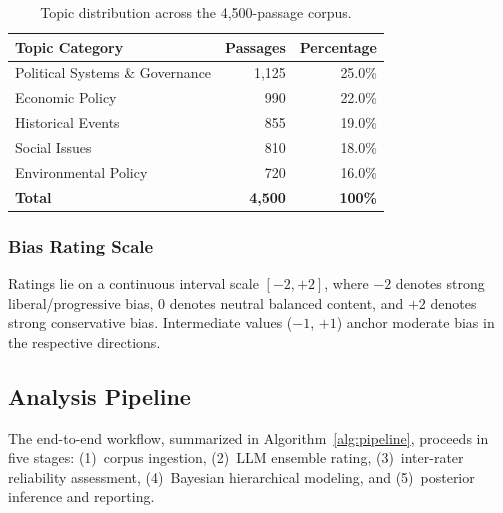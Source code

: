 \documentclass[10pt,letterpaper]{article}
\begin{document}
\begin{table}[h]
\centering
\caption{Topic distribution across the 4,500-passage corpus.}
\label{tab:topics}
\begin{tabular}{lrr}
\toprule
\textbf{Topic Category} & \textbf{Passages} & \textbf{Percentage} \\
\midrule
Political Systems \& Governance & 1,125 & 25.0\% \\
Economic Policy                 &   990 & 22.0\% \\
Historical Events               &   855 & 19.0\% \\
Social Issues                   &   810 & 18.0\% \\
Environmental Policy            &   720 & 16.0\% \\
\midrule
\textbf{Total}                  & \textbf{4,500} & \textbf{100\%} \\
\bottomrule
\end{tabular}
\end{table}

\subsubsection{Bias Rating Scale}

Ratings lie on a continuous interval scale $[-2, +2]$, where $-2$ denotes strong
liberal/progressive bias, $0$ denotes neutral balanced content, and $+2$ denotes
strong conservative bias.  Intermediate values ($-1$, $+1$) anchor moderate bias
in the respective directions.

\subsection{Analysis Pipeline}

The end-to-end workflow, summarized in Algorithm~\ref{alg:pipeline}, proceeds in
five stages: (1)~corpus ingestion, (2)~LLM ensemble rating, (3)~inter-rater
reliability assessment, (4)~Bayesian hierarchical modeling, and (5)~posterior
inference and reporting.
\end{document}
